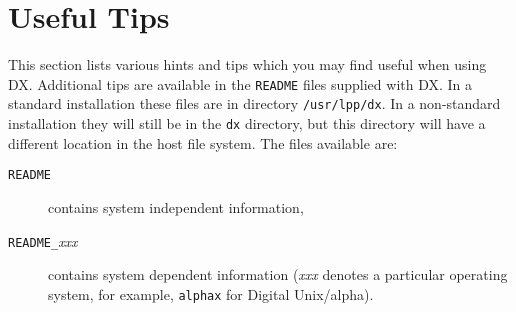 \section{Useful Tips \label{TIPS}  }

This section lists various hints and tips which you may find useful when
using DX. Additional tips are available in the {\tt{README}} files
supplied with DX. In a standard installation these files are in directory
{\tt{/usr/lpp/dx}}. In a non-standard installation they will still be in 
the {\tt{dx}} directory, but this directory will have a different location
in the host file system. The files available are:

\begin{description}

  \item[{\tt README}] contains system independent information,

  \item[{\tt README\_}{\it xxx}] contains system dependent information
   ({\it xxx} denotes a particular operating system, for example,
   {\tt alphax} for Digital Unix/alpha).

\end{description}

